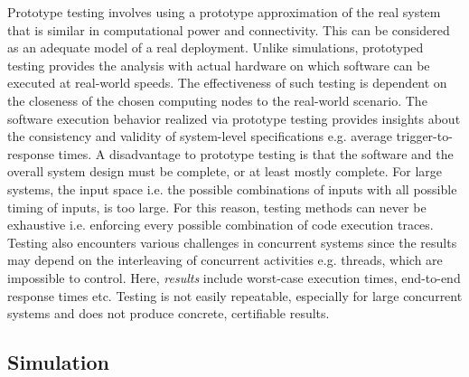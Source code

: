 
Prototype testing involves using a prototype approximation of the real system that is similar in computational power and connectivity. This can be considered as an adequate model of a real deployment. Unlike simulations, prototyped testing provides the analysis with actual hardware on which software can be executed at real-world speeds. The effectiveness of such testing is dependent on the closeness of the chosen computing nodes to the real-world scenario. The software execution behavior realized via prototype testing provides insights about the consistency and validity of system-level specifications e.g. average trigger-to-response times. A disadvantage to prototype testing is that the software and the overall system design must be complete, or at least mostly complete. For large systems, the input space i.e. the possible combinations of inputs with all possible timing of inputs, is too large. For this reason, testing methods can never be exhaustive i.e. enforcing every possible combination of code execution traces. Testing also encounters various challenges in concurrent systems since the results may depend on the interleaving of concurrent activities e.g. threads, which are impossible to control. Here, \emph{results} include worst-case execution times, end-to-end response times etc. Testing is not easily repeatable, especially for large concurrent systems and does not produce concrete, certifiable results. 



\subsection{Simulation}
\label{sec:simulation}

